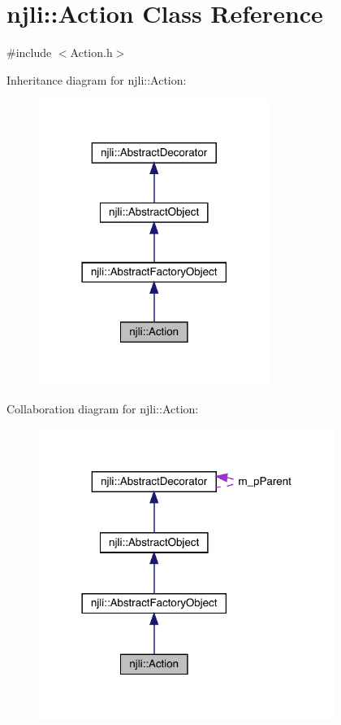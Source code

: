 \hypertarget{classnjli_1_1_action}{}\section{njli\+:\+:Action Class Reference}
\label{classnjli_1_1_action}


{\ttfamily \#include $<$Action.\+h$>$}



Inheritance diagram for njli\+:\+:Action\+:\nopagebreak
\begin{figure}[H]
\begin{center}
\leavevmode
\includegraphics[width=213pt]{classnjli_1_1_action__inherit__graph}
\end{center}
\end{figure}


Collaboration diagram for njli\+:\+:Action\+:\nopagebreak
\begin{figure}[H]
\begin{center}
\leavevmode
\includegraphics[width=273pt]{classnjli_1_1_action__coll__graph}
\end{center}
\end{figure}
